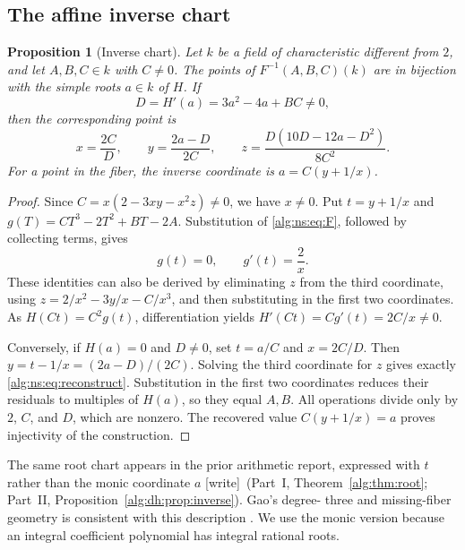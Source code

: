 \documentclass[11pt]{article}
\numberwithin{equation}{section}
\theoremstyle{plain}
\newtheorem{proposition}[proposition]{Proposition}
\theoremstyle{plain}
\theoremstyle{plain}
\theoremstyle{definition}
\theoremstyle{definition}
\theoremstyle{definition}
\theoremstyle{remark}
\newcommand{\wtag}{\textup{[write]}}%
\begin{document}
\subsection{The affine inverse chart}
\begin{proposition}[Inverse chart]\label{alg:ns:prop:inverse}
Let $k$ be a field of characteristic different from $2$, and let
$A,B,C\in k$ with $C\ne0$. The points of $F^{-1}(A,B,C)(k)$ are in
bijection with the simple roots $a\in k$ of $H$. If
\begin{equation}\label{alg:ns:eq:D}
D=H'(a)=3a^2-4a+BC\ne0,
\end{equation}
then the corresponding point is
\begin{equation}\label{alg:ns:eq:reconstruct}
\boxed{\quad
x=\frac{2C}{D},\qquad
 y=\frac{2a-D}{2C},\qquad
 z=\frac{D(10D-12a-D^2)}{8C^2}.
\quad}
\end{equation}
For a point in the fiber, the inverse coordinate is $a=C(y+1/x)$.
\end{proposition}
\begin{proof}
Since $C=x(2-3xy-x^2z)\ne0$, we have $x\ne0$. Put
$t=y+1/x$ and $g(T)=CT^3-2T^2+BT-2A$.
Substitution of \eqref{alg:ns:eq:F}, followed by collecting terms, gives
\begin{equation}\label{alg:ns:eq:inverse-identities}
g(t)=0,\qquad g'(t)=\frac2x.
\end{equation}
These identities can also be derived by eliminating $z$ from the third
coordinate, using $z=2/x^2-3y/x-C/x^3$, and then substituting in the first
two coordinates. As $H(Ct)=C^2g(t)$, differentiation yields
$H'(Ct)=Cg'(t)=2C/x\ne0$.

Conversely, if $H(a)=0$ and $D\ne0$, set $t=a/C$ and $x=2C/D$.
Then $y=t-1/x=(2a-D)/(2C)$. Solving the third coordinate for $z$ gives
exactly \eqref{alg:ns:eq:reconstruct}. Substitution in the first two coordinates
reduces their residuals to multiples of $H(a)$, so they equal $A,B$.
All operations divide only by $2$, $C$, and $D$, which are nonzero.
The recovered value $C(y+1/x)=a$ proves injectivity of the construction.
\end{proof}
The same root chart appears in the prior arithmetic report, expressed
with $t$ rather than the monic coordinate $a$ \wtag{}~(Part~I,
Theorem~\ref{alg:thm:root}; Part~II,
Proposition~\ref{alg:dh:prop:inverse}). Gao's degree-
three and missing-fiber geometry is consistent with this description
\cite{gao}. We use the monic version because an integral coefficient
polynomial has integral rational roots.
\end{document}
